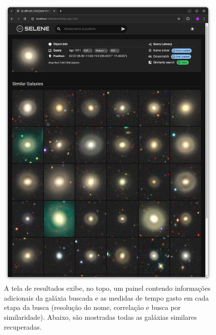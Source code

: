 \begin{figure}[!ht]
  \centering
  \includegraphics[width=\linewidth]{figures/screen-3.png}
  \caption{A tela de resultados exibe, no topo, um painel contendo informações adicionais da galáxia buscada e as medidas de tempo gasto em cada etapa da busca (resolução do nome, correlação e busca por similaridade). Abaixo, são mostradas todas as galáxias similares recuperadas.}
  \label{fig:tela-resultados}
\end{figure}

